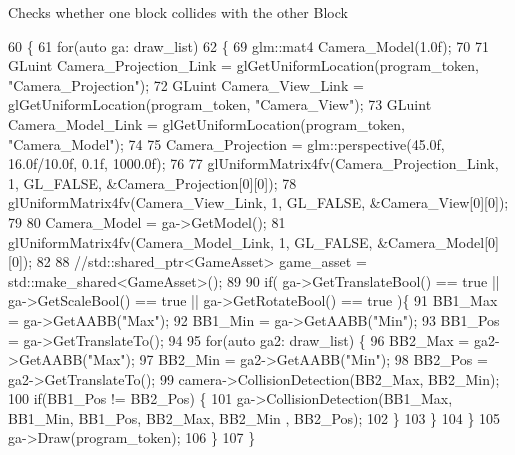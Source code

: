 Checks whether one block collides with the other Block 
\begin{DoxyCode}
60                             \{
61     \textcolor{keywordflow}{for}(\textcolor{keyword}{auto} ga: draw\_list)
62     \{
69         glm::mat4 Camera\_Model(1.0f);
70 
71         GLuint Camera\_Projection\_Link = glGetUniformLocation(program\_token, \textcolor{stringliteral}{"Camera\_Projection"});
72         GLuint Camera\_View\_Link = glGetUniformLocation(program\_token, \textcolor{stringliteral}{"Camera\_View"});
73         GLuint Camera\_Model\_Link = glGetUniformLocation(program\_token, \textcolor{stringliteral}{"Camera\_Model"});
74 
75                 Camera\_Projection = glm::perspective(45.0f, 16.0f/10.0f, 0.1f, 1000.0f);
76                 
77         glUniformMatrix4fv(Camera\_Projection\_Link, 1, GL\_FALSE, &Camera\_Projection[0][0]);
78         glUniformMatrix4fv(Camera\_View\_Link, 1, GL\_FALSE, &Camera\_View[0][0]);
79 
80                 Camera\_Model = ga->GetModel();
81         glUniformMatrix4fv(Camera\_Model\_Link, 1, GL\_FALSE, &Camera\_Model[0][0]);
82         
88                 \textcolor{comment}{//std::shared\_ptr<GameAsset> game\_asset = std::make\_shared<GameAsset>();}
89                 
90                 \textcolor{keywordflow}{if}( ga->GetTranslateBool() == \textcolor{keyword}{true} || ga->GetScaleBool() == \textcolor{keyword}{true} || ga->GetRotateBool() == 
      true )\{
91                         BB1\_Max = ga->GetAABB(\textcolor{stringliteral}{"Max"});
92                         BB1\_Min = ga->GetAABB(\textcolor{stringliteral}{"Min"});
93                         BB1\_Pos = ga->GetTranslateTo();
94                         
95                         \textcolor{keywordflow}{for}(\textcolor{keyword}{auto} ga2: draw\_list) \{
96                                 BB2\_Max = ga2->GetAABB(\textcolor{stringliteral}{"Max"});
97                                 BB2\_Min = ga2->GetAABB(\textcolor{stringliteral}{"Min"});
98                                 BB2\_Pos = ga2->GetTranslateTo();
99                                 camera->CollisionDetection(BB2\_Max, BB2\_Min);
100                                 \textcolor{keywordflow}{if}(BB1\_Pos != BB2\_Pos) \{
101                                          ga->CollisionDetection(BB1\_Max, BB1\_Min, BB1\_Pos, BB2\_Max, BB2\_Min
      , BB2\_Pos);
102                                 \}
103                         \}
104                 \}
105                 ga->Draw(program\_token);
106     \}
107 \}
\end{DoxyCode}
\hypertarget{class_game_asset_manager_a1d9f1f5cc6630a10a0bf358dc2bcddef}{}
